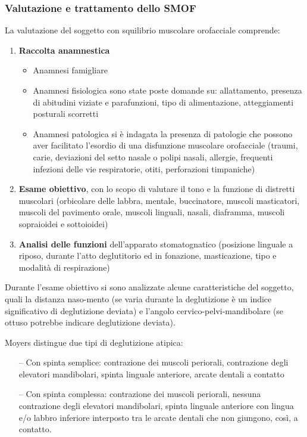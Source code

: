 \subsubsection{Valutazione e trattamento dello SMOF}

La valutazione del soggetto con squilibrio muscolare orofacciale comprende: 

\begin{enumerate}
\item \textbf{Raccolta anamnestica}
\begin{itemize}
 \item Anamnesi famigliare
 \item Anamnesi fisiologica sono state poste domande su: allattamento, presenza di abitudini viziate e parafunzioni, tipo di alimentazione, atteggiamenti posturali scorretti
  \item Anamnesi patologica si è indagata la presenza di patologie che possono aver facilitato l'esordio di una disfunzione muscolare orofacciale (traumi, carie, deviazioni del setto nasale o polipi nasali, allergie, frequenti infezioni delle vie respiratorie, otiti, perforazioni timpaniche)
\end{itemize}
\item \textbf{Esame obiettivo}, con lo scopo di valutare il tono e la funzione di distretti muscolari (orbicolare delle labbra, mentale, buccinatore, muscoli masticatori, muscoli del pavimento orale, muscoli linguali, nasali, diaframma, muscoli sopraioidei e sottoioidei)
\item \textbf{Analisi delle funzioni} dell'apparato stomatognatico (posizione linguale a riposo, durante l'atto deglutitorio ed in fonazione, masticazione, tipo e modalità di respirazione)
\end{enumerate}

Durante l’esame obiettivo si sono analizzate alcune caratteristiche del soggetto, quali la distanza naso-mento (se varia durante la deglutizione è un indice significativo di deglutizione deviata) e l'angolo cervico-pelvi-mandibolare (se ottuso potrebbe indicare deglutizione deviata).

Moyers distingue due tipi di deglutizione atipica: 
\begin{itemize}
 \itemsep-0.5em
  \item[--]Con  spinta  semplice:  contrazione  dei  muscoli  periorali,  contrazione  degli elevatori mandibolari, spinta linguale anteriore, arcate dentali a contatto
  \item[--]Con  spinta  complessa:  contrazione  dei  muscoli  periorali,  nessuna contrazione degli  elevatori  mandibolari,  spinta  linguale  anteriore  con lingua  e/o  labbro inferiore interposto tra le arcate dentali che non giungono, così, a contatto.
\end{itemize}


